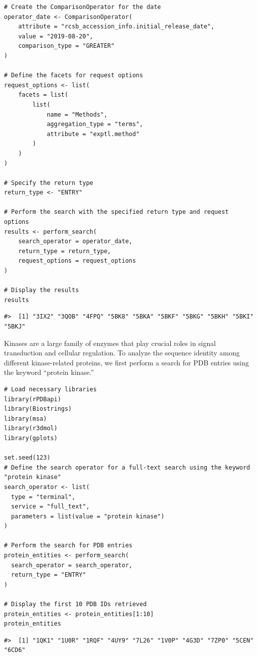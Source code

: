 \begin{verbatim}
# Create the ComparisonOperator for the date
operator_date <- ComparisonOperator(
    attribute = "rcsb_accession_info.initial_release_date",
    value = "2019-08-20",
    comparison_type = "GREATER"
)

# Define the facets for request options
request_options <- list(
    facets = list(
        list(
            name = "Methods",
            aggregation_type = "terms",
            attribute = "exptl.method"
        )
    )
)

# Specify the return type
return_type <- "ENTRY"

# Perform the search with the specified return type and request options
results <- perform_search(
    search_operator = operator_date,
    return_type = return_type,
    request_options = request_options
)

# Display the results
results
\end{verbatim}

\begin{verbatim}
#>  [1] "3IX2" "3QOB" "4FPQ" "5BK8" "5BKA" "5BKF" "5BKG" "5BKH" "5BKI" "5BKJ"
\end{verbatim}

Kinases are a large family of enzymes that play crucial roles in signal transduction and cellular regulation. To analyze the sequence identity among different kinase-related proteins, we first perform a search for PDB entries using the keyword ``protein kinase.''

\begin{verbatim}
# Load necessary libraries
library(rPDBapi)
library(Biostrings)
library(msa)
library(r3dmol)
library(gplots)

set.seed(123)
# Define the search operator for a full-text search using the keyword "protein kinase"
search_operator <- list(
  type = "terminal",
  service = "full_text",
  parameters = list(value = "protein kinase")
)

# Perform the search for PDB entries
protein_entities <- perform_search(
  search_operator = search_operator,
  return_type = "ENTRY"
)

# Display the first 10 PDB IDs retrieved
protein_entities <- protein_entities[1:10]
protein_entities
\end{verbatim}

\begin{verbatim}
#>  [1] "1QK1" "1U0R" "1RQF" "4UY9" "7L26" "1V0P" "4G3D" "7ZP0" "5CEN" "6CD6"
\end{verbatim}

